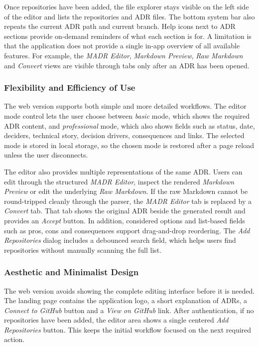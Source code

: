 \documentclass{article}
\begin{document}
Once repositories have been added, the file explorer stays visible on the left side of the editor and lists the repositories and ADR files. The bottom system bar also repeats the current ADR path and current branch. Help icons next to ADR sections provide on-demand reminders of what each section is for. A limitation is that the application does not provide a single in-app overview of all available features. For example, the \textit{MADR Editor}, \textit{Markdown Preview}, \textit{Raw Markdown} and \textit{Convert} views are visible through tabs only after an ADR has been opened.

\subsubsection{Flexibility and Efficiency of Use}
The web version supports both simple and more detailed workflows. The editor mode control lets the user choose between \textit{basic} mode, which shows the required ADR content, and \textit{professional} mode, which also shows fields such as status, date, deciders, technical story, decision drivers, consequences and links. The selected mode is stored in local storage, so the chosen mode is restored after a page reload unless the user disconnects.

The editor also provides multiple representations of the same ADR. Users can edit through the structured \textit{MADR Editor}, inspect the rendered \textit{Markdown Preview} or edit the underlying \textit{Raw Markdown}. If the raw Markdown cannot be round-tripped cleanly through the parser, the \textit{MADR Editor} tab is replaced by a \textit{Convert} tab. That tab shows the original ADR beside the generated result and provides an \textit{Accept} button. In addition, considered options and list-based fields such as pros, cons and consequences support drag-and-drop reordering. The \textit{Add Repositories} dialog includes a debounced search field, which helps users find repositories without manually scanning the full list.

\subsubsection{Aesthetic and Minimalist Design}
The web version avoids showing the complete editing interface before it is needed. The landing page contains the application logo, a short explanation of ADRs, a \textit{Connect to GitHub} button and a \textit{View on GitHub} link. After authentication, if no repositories have been added, the editor area shows a single centered \textit{Add Repositories} button. This keeps the initial workflow focused on the next required action.
\end{document}
